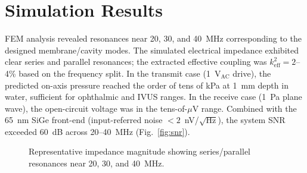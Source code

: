 \documentclass[conference]{IEEEtran}
\begin{document}
\section{Simulation Results}

FEM analysis revealed resonances near 20, 30, and 40~MHz corresponding
to the designed membrane/cavity modes. The simulated electrical
impedance exhibited clear series and parallel resonances; the extracted
effective coupling was $k^2_{\mathrm{eff}}=2$--4\% based on the
frequency split. In the transmit case (1~V$_\mathrm{AC}$ drive), the
predicted on-axis pressure reached the order of tens of kPa at 1~mm
depth in water, sufficient for ophthalmic and IVUS ranges. In the
receive case (1~Pa plane wave), the open-circuit voltage was in the
tens-of-$\mu$V range. Combined with the 65~nm SiGe front-end
(input-referred noise $<2$~nV/$\sqrt{\mathrm{Hz}}$), the system SNR
exceeded 60~dB across 20--40~MHz (Fig.~\ref{fig:snr}).

\begin{figure}[t]
\centering
{}
\caption{Representative impedance magnitude showing series/parallel
resonances near 20, 30, and 40~MHz.}
\label{fig:imp}
\end{figure}
\end{document}
